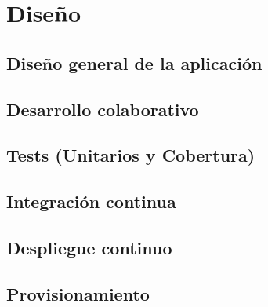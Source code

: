 \chapter{Diseño}
\section{Diseño general de la aplicación}
\section{Desarrollo colaborativo}
\section {Tests (Unitarios y Cobertura)}
\section {Integración continua}
\section {Despliegue continuo}
\section {Provisionamiento}
